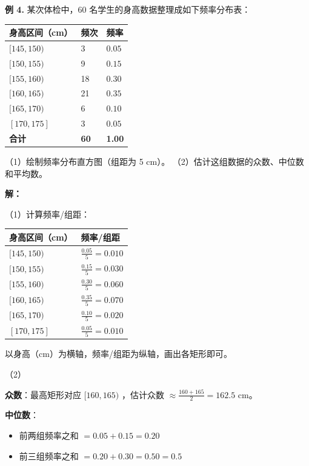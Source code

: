 \begin{workedexamples}


\textbf{例 4.} 某次体检中，60 名学生的身高数据整理成如下频率分布表：

\begin{center}
\begin{tabular}{lll}
\toprule
身高区间（cm） & 频次 & 频率 \\
\midrule
$[145, 150)$ & 3 & $0.05$ \\
$[150, 155)$ & 9 & $0.15$ \\
$[155, 160)$ & 18 & $0.30$ \\
$[160, 165)$ & 21 & $0.35$ \\
$[165, 170)$ & 6 & $0.10$ \\
$[170, 175]$ & 3 & $0.05$ \\
\textbf{合计} & \textbf{60} & \textbf{1.00} \\
\bottomrule
\end{tabular}
\end{center}


（1）绘制频率分布直方图（组距为 5 cm）。
（2）估计这组数据的众数、中位数和平均数。

\textbf{解：}

（1）计算频率/组距：

\begin{center}
\begin{tabular}{ll}
\toprule
身高区间（cm） & 频率/组距 \\
\midrule
$[145, 150)$ & $\frac{0.05}{5} = 0.010$ \\
$[150, 155)$ & $\frac{0.15}{5} = 0.030$ \\
$[155, 160)$ & $\frac{0.30}{5} = 0.060$ \\
$[160, 165)$ & $\frac{0.35}{5} = 0.070$ \\
$[165, 170)$ & $\frac{0.10}{5} = 0.020$ \\
$[170, 175]$ & $\frac{0.05}{5} = 0.010$ \\
\bottomrule
\end{tabular}
\end{center}


以身高（cm）为横轴，频率/组距为纵轴，画出各矩形即可。

（2）

\textbf{众数}：最高矩形对应 $[160, 165)$ ，估计众数 $\approx \frac{160 + 165}{2} = 162.5$ cm。

\textbf{中位数}：
\begin{itemize}
  \item 前两组频率之和 $= 0.05 + 0.15 = 0.20$
  \item 前三组频率之和 $= 0.20 + 0.30 = 0.50 = 0.5$
\end{itemize}



\end{workedexamples}
